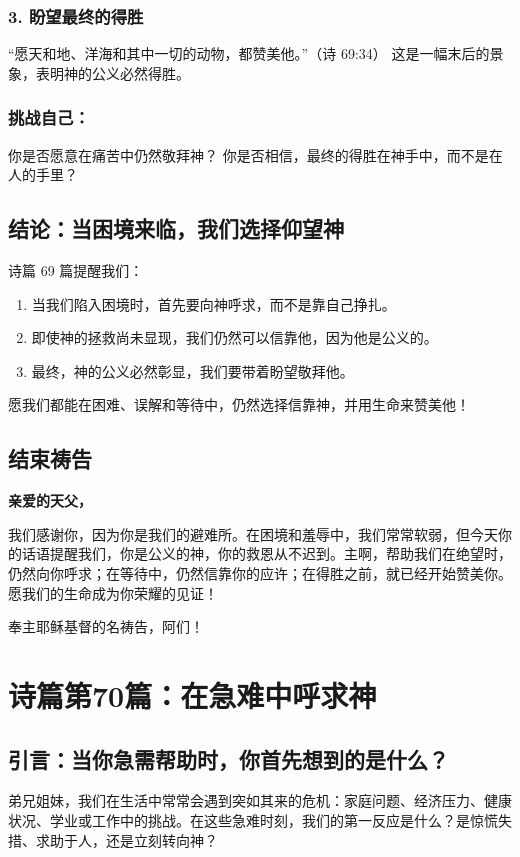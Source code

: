 \documentclass[a4paper, 12pt]{article}
\begin{document}
\subsubsection*{3. 盼望最终的得胜}
“愿天和地、洋海和其中一切的动物，都赞美他。”（诗 69:34）
这是一幅末后的景象，表明神的公义必然得胜。
\subsubsection*{挑战自己：}
你是否愿意在痛苦中仍然敬拜神？
你是否相信，最终的得胜在神手中，而不是在人的手里？
\subsection*{结论：当困境来临，我们选择仰望神}
诗篇 69 篇提醒我们：
\begin{enumerate}
    \item 当我们陷入困境时，首先要向神呼求，而不是靠自己挣扎。

    \item 即使神的拯救尚未显现，我们仍然可以信靠他，因为他是公义的。

    \item 最终，神的公义必然彰显，我们要带着盼望敬拜他。

\end{enumerate}

愿我们都能在困难、误解和等待中，仍然选择信靠神，并用生命来赞美他！

\subsection*{结束祷告}
\textbf{亲爱的天父，}

我们感谢你，因为你是我们的避难所。在困境和羞辱中，我们常常软弱，但今天你的话语提醒我们，你是公义的神，你的救恩从不迟到。主啊，帮助我们在绝望时，仍然向你呼求；在等待中，仍然信靠你的应许；在得胜之前，就已经开始赞美你。愿我们的生命成为你荣耀的见证！

奉主耶稣基督的名祷告，阿们！
\newpage
\section{诗篇第70篇：在急难中呼求神}
\subsection*{引言：当你急需帮助时，你首先想到的是什么？}
\hspace{0.6cm}弟兄姐妹，我们在生活中常常会遇到突如其来的危机：家庭问题、经济压力、健康状况、学业或工作中的挑战。在这些急难时刻，我们的第一反应是什么？是惊慌失措、求助于人，还是立刻转向神？
\end{document}
